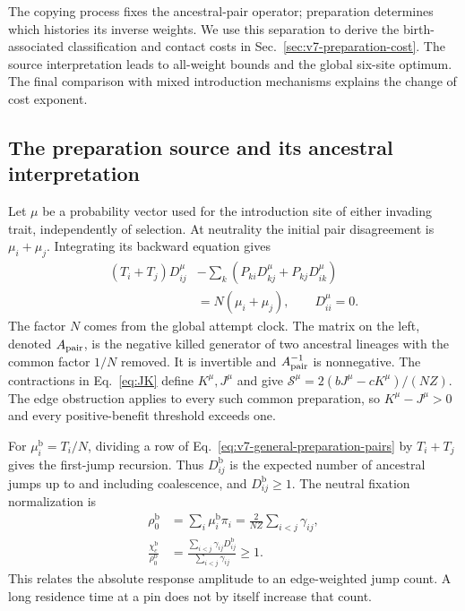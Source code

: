 \documentclass[aps,pre,reprint,amsmath,amssymb,longbibliography]{revtex4-2}
\begin{document}
The copying process fixes the ancestral-pair operator; preparation
determines which histories its inverse weights. We use this separation
to derive the birth-associated classification and contact costs in
Sec.~\ref{sec:v7-preparation-cost}. The source interpretation leads to
all-weight bounds and the global six-site optimum. The final comparison
with mixed introduction mechanisms explains the change of cost exponent.

\subsection{The preparation source and its ancestral interpretation}
\label{app:v7-preparation-source}
Let $\mu$ be a probability vector used for the introduction site of
either invading trait, independently of selection. At neutrality the
initial pair disagreement is $\mu_i+\mu_j$. Integrating its backward
equation gives
\begin{equation}
 \begin{aligned}
 (T_i+T_j)D_{ij}^{\mu}
 &-\sum_k(P_{ki}D_{kj}^{\mu}+P_{kj}D_{ik}^{\mu})\\
 &=N(\mu_i+\mu_j),\qquad D_{ii}^{\mu}=0.
 \end{aligned}
 \label{eq:v7-general-preparation-pairs}
\end{equation}
The factor $N$ comes from the global attempt clock. The matrix on the
left, denoted $A_{\rm pair}$, is the negative killed generator of two ancestral
lineages with the common factor $1/N$ removed. It is invertible and
$A_{\rm pair}^{-1}$ is nonnegative. The contractions in Eq.~\eqref{eq:JK}
define $K^\mu,J^\mu$ and give
$\mathcal S^\mu=2(bJ^\mu-cK^\mu)/(NZ)$.
The edge obstruction applies to every such common preparation, so
$K^\mu-J^\mu>0$ and every positive-benefit threshold exceeds one.

For $\mu_i^{\mathrm b}=T_i/N$, dividing a row of
Eq.~\eqref{eq:v7-general-preparation-pairs} by $T_i+T_j$ gives the
first-jump recursion. Thus $D_{ij}^{\mathrm b}$ is the expected
number of ancestral jumps up to and including coalescence, and
$D_{ij}^{\mathrm b}\ge1$. The neutral fixation normalization is
\begin{equation}
 \begin{aligned}
 \rho_0^{\mathrm b}
 &=\sum_i\mu_i^{\mathrm b}\pi_i
 =\frac{2}{NZ}\sum_{i<j}\gamma_{ij},\\
 \frac{\chi_c^{\mathrm b}}{\rho_0^{\mathrm b}}
 &=\frac{\sum_{i<j}\gamma_{ij}D_{ij}^{\mathrm b}}
        {\sum_{i<j}\gamma_{ij}}\ge1.
 \end{aligned}
 \label{eq:v7-birth-normalization}
\end{equation}
This relates the absolute response amplitude to an edge-weighted jump
count. A long residence time at a pin does not by itself increase
that count.
\end{document}
